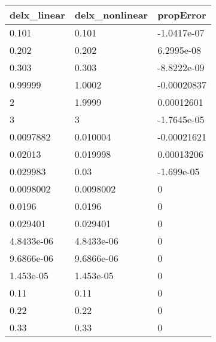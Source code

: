 \begin{tabular}{lll}
delx_linear & delx_nonlinear & propError \\ 
\hline 
0.101 & 0.101 & -1.0417e-07 \\ 
0.202 & 0.202 & 6.2995e-08 \\ 
0.303 & 0.303 & -8.8222e-09 \\ 
0.99999 & 1.0002 & -0.00020837 \\ 
2 & 1.9999 & 0.00012601 \\ 
3 & 3 & -1.7645e-05 \\ 
0.0097882 & 0.010004 & -0.00021621 \\ 
0.02013 & 0.019998 & 0.00013206 \\ 
0.029983 & 0.03 & -1.699e-05 \\ 
0.0098002 & 0.0098002 & 0 \\ 
0.0196 & 0.0196 & 0 \\ 
0.029401 & 0.029401 & 0 \\ 
4.8433e-06 & 4.8433e-06 & 0 \\ 
9.6866e-06 & 9.6866e-06 & 0 \\ 
1.453e-05 & 1.453e-05 & 0 \\ 
0.11 & 0.11 & 0 \\ 
0.22 & 0.22 & 0 \\ 
0.33 & 0.33 & 0 \\ 
\hline 
\end{tabular}